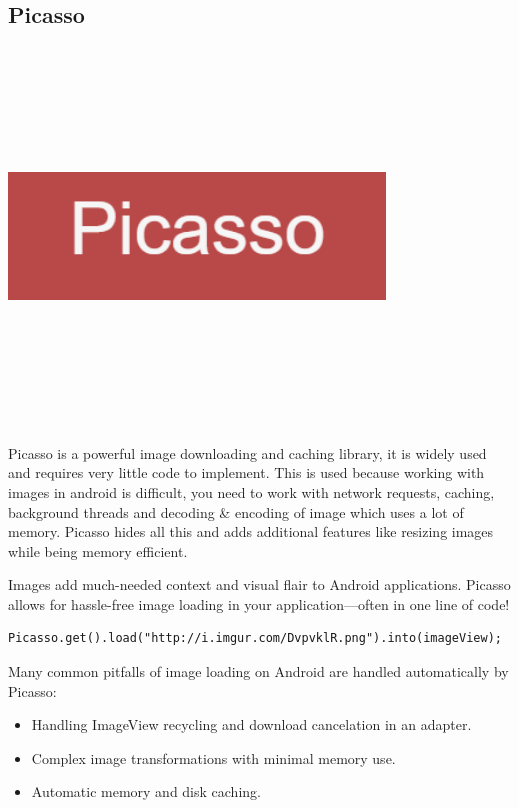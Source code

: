 \subsection{Picasso}
\par
\medskip
\begin{center}
    \includegraphics[width=10cm,height=10cm,keepaspectratio]{Images/picasso.png}
\end{center}
Picasso is a powerful image downloading and caching library, it is widely used and requires very little code to implement.
This is used because working with images in android is difficult, you need to work with network requests, caching, background threads and decoding \& encoding of image which uses a lot of memory. Picasso hides all this and adds additional features like resizing images while being memory efficient.\newline

Images add much-needed context and visual flair to Android applications. Picasso allows for hassle-free image loading in your application—often in one line of code!

\begin{lstlisting}
Picasso.get().load("http://i.imgur.com/DvpvklR.png").into(imageView);
\end{lstlisting}


Many common pitfalls of image loading on Android are handled automatically by Picasso:
\begin{itemize}
    \item Handling ImageView recycling and download cancelation in an adapter.
    \item Complex image transformations with minimal memory use.
    \item Automatic memory and disk caching.
\end{itemize}

